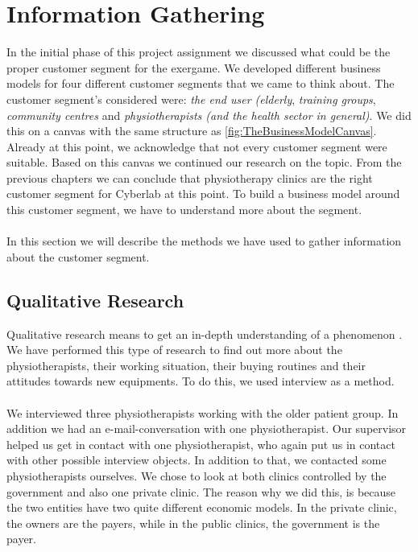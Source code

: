 \chapter{Information Gathering}
In the initial phase of this project assignment we discussed what could be the proper customer segment for the exergame. We developed different business models for four different customer segments that we came to think about. The customer segment's considered were: \emph{the end user (elderly}, \emph{training groups}, \emph{community centres} and \emph{physiotherapists (and the health sector in general)}.  We did this on a canvas with the same structure as \ref{fig:TheBusinessModelCanvas}. Already at this point, we acknowledge that not every customer segment were suitable. Based on this canvas we continued our research on the topic. From the previous chapters we can conclude that physiotherapy clinics are the right customer segment for Cyberlab at this point. To build a business model around this customer segment, we have to understand more about the segment. \\ \\
In this section we will describe the methods we have used to gather information about the customer segment.

\section{Qualitative Research}
Qualitative research means to get an in-depth understanding of a phenomenon \cite{interview2}. We have performed this type of research to find out more about the physiotherapists, their working situation, their buying routines and their attitudes towards new equipments. To do this, we used interview as a method. \\ \\
We interviewed three physiotherapists working with the older patient group. In addition we had an e-mail-conversation with one physiotherapist. Our supervisor helped us get in contact with one physiotherapist, who again put us in contact with other possible interview objects. In addition to that, we contacted some physiotherapists ourselves. We chose to look at both clinics controlled by the government and also one private clinic. The reason why we did this, is because the two entities have two quite different economic models. In the private clinic, the owners are the payers, while in the public clinics, the government is the payer.

